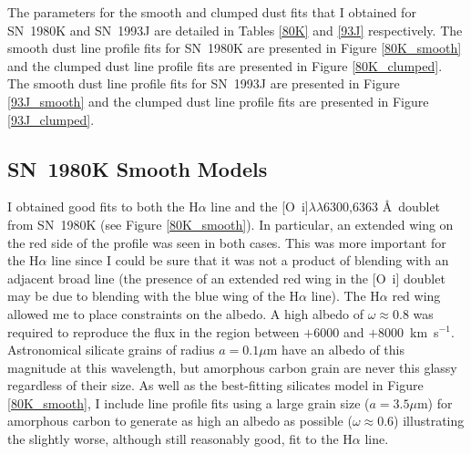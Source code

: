 The parameters for the smooth and clumped dust fits  that I obtained for SN~1980K and SN~1993J are detailed in Tables \ref{80K} and \ref{93J} respectively. The smooth dust line profile fits for SN~1980K are presented in Figure \ref{80K_smooth} and the clumped dust line profile fits are presented in Figure \ref{80K_clumped}.  The smooth dust line profile fits for SN~1993J are presented in Figure \ref{93J_smooth} and the clumped dust line profile fits are presented in Figure \ref{93J_clumped}.  

\subsection{SN~1980K Smooth Models}

I obtained good fits to both the H$\alpha$ line and the [O~{\sc i}]$\lambda\lambda$6300,6363 \AA\  doublet from SN~1980K (see Figure \ref{80K_smooth}).  In particular, an extended wing on the red side of the profile was seen in both cases. This was more important for the H$\alpha$ line since I could be sure that it was not a product of blending with an adjacent broad line (the presence of an extended red wing in the [O~{\sc i}] doublet may be due to blending with the blue wing of the H$\alpha$ line).  The H$\alpha$ red wing allowed me to place constraints on the albedo.  A high albedo of $\omega\approx0.8$  was required to reproduce the flux in the region between $+6000$ and $+8000$~km~s$^{-1}$.  Astronomical silicate grains \citep{Draine1984} of radius $a=0.1\mu$m have an albedo of this magnitude at this wavelength, but amorphous carbon grain are never this glassy regardless of their size.  As well as the best-fitting silicates model in Figure \ref{80K_smooth}, I include line profile fits using a large grain size ($a=3.5\mu$m) for amorphous carbon to generate as high an albedo as possible ($\omega\approx0.6$) illustrating the slightly worse, although still reasonably good, fit to the H$\alpha$ line.  

